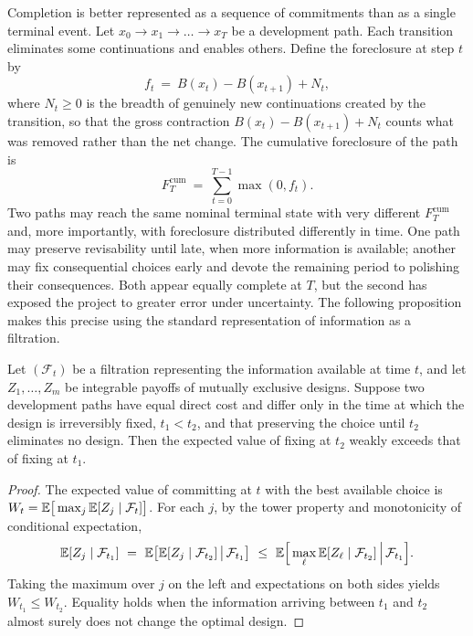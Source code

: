 Completion is better represented as a sequence of commitments than as a single terminal event. Let $x_0\to x_1\to\dots\to x_T$ be a development path. Each transition eliminates some continuations and enables others. Define the foreclosure at step $t$ by
\begin{equation}
f_t\ =\ B(x_t)-B(x_{t+1})+N_t,
\end{equation}
where $N_t\geq 0$ is the breadth of genuinely new continuations created by the transition, so that the gross contraction $B(x_t)-B(x_{t+1})+N_t$ counts what was removed rather than the net change. The cumulative foreclosure of the path is
\begin{equation}
F^{\mathrm{cum}}_T\ =\ \sum_{t=0}^{T-1}\max(0,f_t).
\end{equation}
Two paths may reach the same nominal terminal state with very different $F^{\mathrm{cum}}_T$ and, more importantly, with foreclosure distributed differently in time. One path may preserve revisability until late, when more information is available; another may fix consequential choices early and devote the remaining period to polishing their consequences. Both appear equally complete at $T$, but the second has exposed the project to greater error under uncertainty. The following proposition makes this precise using the standard representation of information as a filtration.

\begin{proposition}\label{prop:delay}
Let $(\mathcal{F}_t)$ be a filtration representing the information available at time $t$, and let $Z_1,\dots,Z_m$ be integrable payoffs of mutually exclusive designs. Suppose two development paths have equal direct cost and differ only in the time at which the design is irreversibly fixed, $t_1<t_2$, and that preserving the choice until $t_2$ eliminates no design. Then the expected value of fixing at $t_2$ weakly exceeds that of fixing at $t_1$.
\end{proposition}

\begin{proof}
The expected value of committing at $t$ with the best available choice is $W_t=\mathbb{E}\big[\max_j\mathbb{E}[Z_j\mid\mathcal{F}_t]\big]$. For each $j$, by the tower property and monotonicity of conditional expectation,
\[
\E[Z_j\mid\mathcal{F}_{t_1}]\ =\ \E\big[\E[Z_j\mid\mathcal{F}_{t_2}]\,\big|\,\mathcal{F}_{t_1}\big]\ \leq\ \E\Big[\max_\ell\E[Z_\ell\mid\mathcal{F}_{t_2}]\,\Big|\,\mathcal{F}_{t_1}\Big].
\]
Taking the maximum over $j$ on the left and expectations on both sides yields $W_{t_1}\leq W_{t_2}$. Equality holds when the information arriving between $t_1$ and $t_2$ almost surely does not change the optimal design.
\end{proof}

